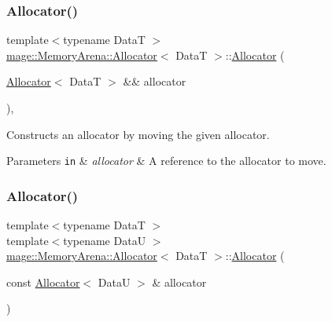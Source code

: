 \subsubsection{\texorpdfstring{Allocator()}{Allocator()}\hspace{0.1cm}{\footnotesize\ttfamily [2/4]}}
{\footnotesize\ttfamily template$<$typename DataT $>$ \\
\hyperlink{structmage_1_1_memory_arena_1_1_allocator}{mage\+::\+Memory\+Arena\+::\+Allocator}$<$ DataT $>$\+::\hyperlink{structmage_1_1_memory_arena_1_1_allocator}{Allocator} (\begin{DoxyParamCaption}\item[{\hyperlink{structmage_1_1_memory_arena_1_1_allocator}{Allocator}$<$ DataT $>$ \&\&}]{allocator }\end{DoxyParamCaption})\hspace{0.3cm}{\ttfamily [default]}, {\ttfamily [noexcept]}}

Constructs an allocator by moving the given allocator.


\begin{DoxyParams}[1]{Parameters}
\mbox{\tt in}  & {\em allocator} & A reference to the allocator to move. \\
\hline
\end{DoxyParams}
\hypertarget{structmage_1_1_memory_arena_1_1_allocator_a9485ec7437c3c798a37c67631aa7e8ab}{}\label{structmage_1_1_memory_arena_1_1_allocator_a9485ec7437c3c798a37c67631aa7e8ab} 
\subsubsection{\texorpdfstring{Allocator()}{Allocator()}\hspace{0.1cm}{\footnotesize\ttfamily [3/4]}}
{\footnotesize\ttfamily template$<$typename DataT $>$ \\
template$<$typename DataU $>$ \\
\hyperlink{structmage_1_1_memory_arena_1_1_allocator}{mage\+::\+Memory\+Arena\+::\+Allocator}$<$ DataT $>$\+::\hyperlink{structmage_1_1_memory_arena_1_1_allocator}{Allocator} (\begin{DoxyParamCaption}\item[{const \hyperlink{structmage_1_1_memory_arena_1_1_allocator}{Allocator}$<$ DataU $>$ \&}]{allocator }\end{DoxyParamCaption})\hspace{0.3cm}{\ttfamily [noexcept]}}

